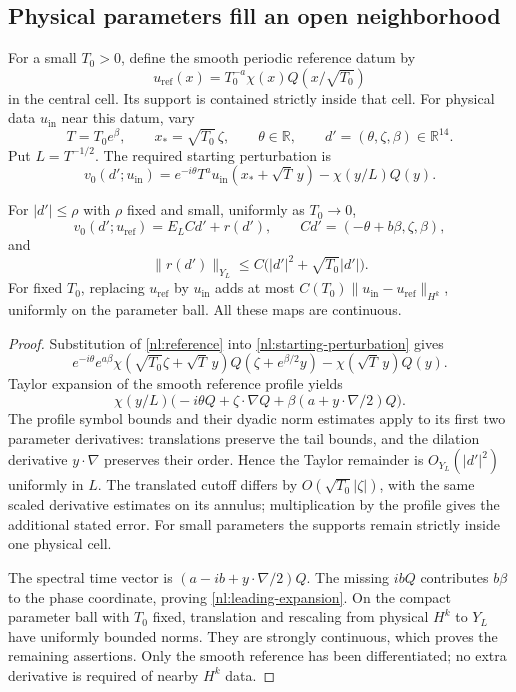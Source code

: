 \subsection{Physical parameters fill an open neighborhood}

For a small $T_0>0$, define the smooth periodic reference datum by
\begin{equation}\label{nl:reference}
 u_{\mathrm{ref}}(x)=T_0^{-a}\chi(x)Q(x/\sqrt{T_0})
\end{equation}
in the central cell. Its support is contained strictly inside that cell.
For physical data $u_{\mathrm{in}}$ near this datum, vary
\[
 T=T_0e^\beta,\qquad x_*=\sqrt{T_0}\,\zeta,\qquad \theta\in\mathbb R,
 \qquad d'=(\theta,\zeta,\beta)\in\mathbb R^{14}.
\]
Put $L=T^{-1/2}$. The required starting perturbation is
\begin{equation}\label{nl:starting-perturbation}
 v_0(d';u_{\mathrm{in}})
 =e^{-i\theta}T^a u_{\mathrm{in}}(x_*+\sqrt T\,y)
      -\chi(y/L)Q(y).
\end{equation}

\begin{lemma}\label{nl:parameter-expansion}
For $|d'|\leq\rho$ with $\rho$ fixed and small, uniformly as $T_0\to0$,
\begin{equation}\label{nl:leading-expansion}
 v_0(d';u_{\mathrm{ref}})
 =E_L C d'+r(d'),\qquad
 C d'=(-\theta+b\beta,\zeta,\beta),
\end{equation}
and
\[
 \|r(d')\|_{Y_L}\leq C\bigl(|d'|^2+\sqrt{T_0}|d'|\bigr).
\]
For fixed $T_0$, replacing $u_{\mathrm{ref}}$ by $u_{\mathrm{in}}$
adds at most $C(T_0)\|u_{\mathrm{in}}-u_{\mathrm{ref}}\|_{H^k}$,
uniformly on the parameter ball. All these maps are continuous.
\end{lemma}

\begin{proof}
Substitution of \eqref{nl:reference} into
\eqref{nl:starting-perturbation} gives
\[
 e^{-i\theta}e^{a\beta}
 \chi(\sqrt{T_0}\zeta+\sqrt T\,y)
 Q(\zeta+e^{\beta/2}y)-\chi(\sqrt T\,y)Q(y).
\]
Taylor expansion of the smooth reference profile yields
\[
 \chi(y/L)\bigl(-i\theta Q+\zeta\cdot\nabla Q
                    +\beta(a+y\cdot\nabla/2)Q\bigr).
\]
The profile symbol bounds and their dyadic norm estimates apply to its
first two parameter derivatives: translations preserve the tail bounds,
and the dilation derivative $y\cdot\nabla$ preserves their order.
Hence the Taylor remainder is $O_{Y_L}(|d'|^2)$ uniformly in $L$.
The translated cutoff differs by $O(\sqrt{T_0}|\zeta|)$, with the same
scaled derivative estimates on its annulus; multiplication by the
profile gives the additional stated error. For small parameters the
supports remain strictly inside one physical cell.

The spectral time vector is $(a-ib+y\cdot\nabla/2)Q$.
The missing $ibQ$ contributes $b\beta$ to the phase coordinate, proving
\eqref{nl:leading-expansion}. On the compact parameter ball with $T_0$
fixed, translation and rescaling from physical $H^k$ to $Y_L$ have
uniformly bounded norms. They are strongly continuous, which proves the
remaining assertions. Only the smooth reference has been differentiated;
no extra derivative is required of nearby $H^k$ data.
\end{proof}

